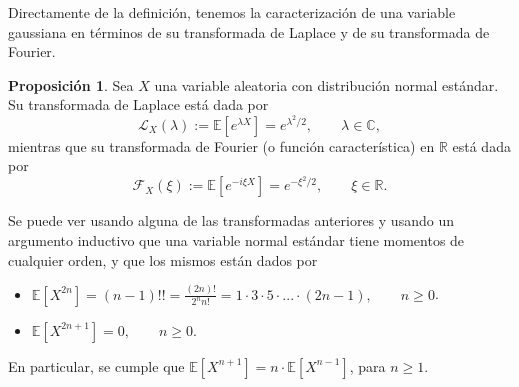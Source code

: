 \documentclass[letterpaper,twoside,12pt]{book}
\newcommand{\R}{\mathbb{R}}
\newcommand{\C}{\mathbb{C}}
\newcommand{\E}{\mathbb{E}}
\newcommand{\1}{\mathds{1}}
\theoremstyle{definition}
\theoremstyle{definition}
\theoremstyle{remark}
\theoremstyle{definition}
\theoremstyle{definition}
\newtheorem{prop}{Proposición}
\theoremstyle{definition}
\theoremstyle{definition}
\theoremstyle{definition}
\begin{document}
Directamente de la definición, tenemos la caracterización de una variable gaussiana en términos de su transformada de Laplace y de su transformada de Fourier.
\begin{prop}\label{definiciongaussiana}
 Sea $X$ una variable aleatoria con distribución normal estándar. Su transformada de Laplace está dada por 
 \[
 \mathcal{L}_X(\lambda):=\E\left[e^{\lambda X}\right]=e^{\lambda^2/2}, \qquad \lambda\in \C,
 \]
mientras que su transformada de Fourier (o función característica) en $\R$ está dada por 
\[
\mathcal{F}_X(\xi):=\E\left[e^{-i\xi X}\right]=e^{-\xi^2/2}, \qquad \xi \in \R. 
\]
 \end{prop}
Se puede ver usando alguna de las transformadas anteriores y usando un argumento inductivo que una variable normal estándar tiene momentos de cualquier orden, y que los mismos están dados por 
 \begin{itemize}
   \item $\E\left[X^{2n}\right]=(n-1)!!=\frac{(2n)!}{2^nn!}=1\cdot3\cdot5\cdot...\cdot (2n-1), \qquad n\geq0$.
   \item $\E\left[X^{2n+1}\right]=0, \qquad n\geq0$.
 \end{itemize}
 En particular, se cumple que $\E\left[X^{n+1}\right]=n\cdot \E\left[X^{n-1}\right]$, para $n\geq1$.
\end{document}
